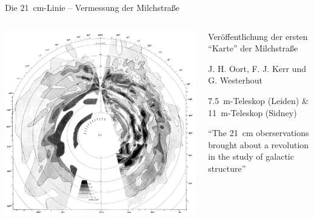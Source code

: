 \begin{frame}{Die \SI{21}{\centi\meter}-Linie – Vermessung der Milchstraße}%
  \begin{columns}[c, onlytextwidth]
    \begin{column}{0.47\textwidth}%
      \includegraphics[width=\textwidth, angle=180]{./images/original_map.png}%
    \end{column}%
    \begin{column}{0.47\textwidth}%
      \begin{description}[Messung]
        \item[1958] Veröffentlichung der ersten \enquote{Karte} der Milchstraße
        \item[Autoren] J. H. Oort, F. J. Kerr und G. Westerhout
        \item[Messung] \SI{7.5}{\meter}-Teleskop (Leiden) \&  \SI{11}{\meter}-Teleskop (Sidney)
      \end{description}

      \begin{center}
      \parbox{0.85\linewidth}{\enquote{The \SI{21}{\centi\meter} oberservations brought about a revolution in the study of galactic structure}}
      \end{center}
    \end{column}%
  \end{columns}
\end{frame}
